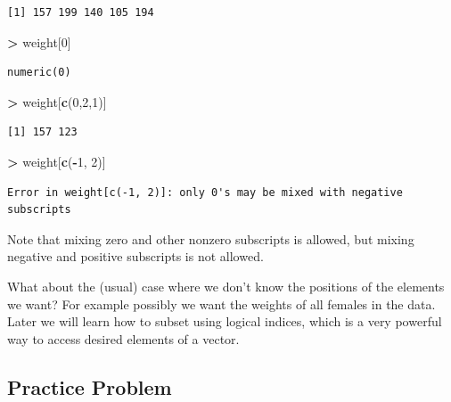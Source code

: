 \documentclass[]{krantz}
\makeatletter
\newenvironment{Shaded}{\begin{snugshade}}{\end{snugshade}}
\newcommand{\KeywordTok}[1]{\textcolor[rgb]{0.27,0.27,0.27}{\textbf{#1}}}
\newcommand{\DecValTok}[1]{\textcolor[rgb]{0.06,0.06,0.06}{#1}}
\newcommand{\StringTok}[1]{\textcolor[rgb]{0.5,0.5,0.5}{#1}}
\newcommand{\OperatorTok}[1]{\textcolor[rgb]{0.43,0.43,0.43}{\textbf{#1}}}
\newcommand{\NormalTok}[1]{#1}
\newenvironment{kframe}{%
\medskip{}
\setlength{\fboxsep}{.8em}
 \def\at@end@of@kframe{}%
 \ifinner\ifhmode%
  \def\at@end@of@kframe{\end{minipage}}%
  \begin{minipage}{\columnwidth}%
 \fi\fi%
 \def\FrameCommand##1{\hskip\@totalleftmargin \hskip-\fboxsep
 \colorbox{shadecolor}{##1}\hskip-\fboxsep
     \hskip-\linewidth \hskip-\@totalleftmargin \hskip\columnwidth}%
 \MakeFramed {\advance\hsize-\width
   \@totalleftmargin\z@ \linewidth\hsize
   \@setminipage}}%
 {\par\unskip\endMakeFramed%
 \at@end@of@kframe}
\renewenvironment{Shaded}{\begin{kframe}}{\end{kframe}}
\makeatother
\begin{document}
\begin{verbatim}
[1] 157 199 140 105 194
\end{verbatim}

\begin{Shaded}
\begin{Highlighting}[]
\OperatorTok{>}\StringTok{ }\NormalTok{weight[}\DecValTok{0}\NormalTok{]}
\end{Highlighting}
\end{Shaded}

\begin{verbatim}
numeric(0)
\end{verbatim}

\begin{Shaded}
\begin{Highlighting}[]
\OperatorTok{>}\StringTok{ }\NormalTok{weight[}\KeywordTok{c}\NormalTok{(}\DecValTok{0}\NormalTok{,}\DecValTok{2}\NormalTok{,}\DecValTok{1}\NormalTok{)]}
\end{Highlighting}
\end{Shaded}

\begin{verbatim}
[1] 157 123
\end{verbatim}

\begin{Shaded}
\begin{Highlighting}[]
\OperatorTok{>}\StringTok{ }\NormalTok{weight[}\KeywordTok{c}\NormalTok{(}\OperatorTok{-}\DecValTok{1}\NormalTok{, }\DecValTok{2}\NormalTok{)]}
\end{Highlighting}
\end{Shaded}

\begin{verbatim}
Error in weight[c(-1, 2)]: only 0's may be mixed with negative subscripts
\end{verbatim}

Note that mixing zero and other nonzero subscripts is allowed, but
mixing negative and positive subscripts is not allowed.

What about the (usual) case where we don't know the positions of the
elements we want? For example possibly we want the weights of all
females in the data. Later we will learn how to subset using logical
indices, which is a very powerful way to access desired elements of a
vector.

\subsection{Practice Problem}\label{practice-problem-1}
\end{document}
